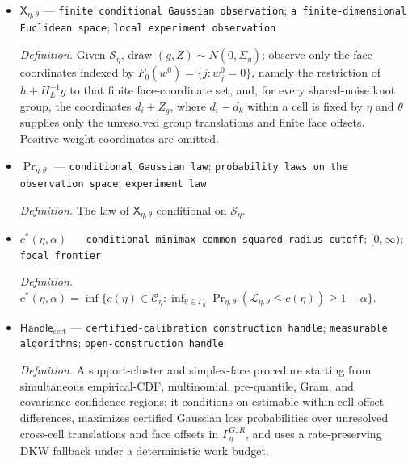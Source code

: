 \documentclass{article}
\begin{document}
\begin{itemize}
  \par\smallskip\noindent\emph{Definition.} Conditional covariance of the joint pre-score and post bridge coordinates given \(\mathscr S_\eta\), with pre block \(\Omega\), within-cell bridge covariance in the post block, and zero covariance between the independent pre and post blocks.
  \item \(\mathsf X_{\eta,\theta}\) --- \texttt{finite conditional Gaussian observation}; \texttt{a finite-\allowbreak{}dimensional Euclidean space}; \texttt{local experiment observation}
  \par\smallskip\noindent\emph{Definition.} Given \(\mathscr S_\eta\), draw \((g,Z)\sim N(0,\Sigma_\eta)\); observe only the face coordinates indexed by \(F_0(w^0)=\{j:w_j^0=0\}\), namely the restriction of \(h+H_L^{-1}g\) to that finite face-coordinate set, and, for every shared-noise knot group, the coordinates \(d_i+Z_g\), where \(d_i-d_k\) within a cell is fixed by \(\eta\) and \(\theta\) supplies only the unresolved group translations and finite face offsets. Positive-weight coordinates are omitted.
  \item \(\Pr_{\eta,\theta}\) --- \texttt{conditional Gaussian law}; \texttt{probability laws on the observation space}; \texttt{experiment law}
  \par\smallskip\noindent\emph{Definition.} The law of \(\mathsf X_{\eta,\theta}\) conditional on \(\mathscr S_\eta\).
  \item \(c^*(\eta,\alpha)\) --- \texttt{conditional minimax common squared-\allowbreak{}radius cutoff}; \([0,\infty)\); \texttt{focal frontier}
  \par\smallskip\noindent\emph{Definition.} \(c^*(\eta,\alpha)=\inf\{c(\eta)\in\mathscr C_\eta:\inf_{\theta\in\Gamma_\eta}\Pr_{\eta,\theta}(\mathcal L_{\eta,\theta}\leq c(\eta))\geq1-\alpha\}\).
  \item \(\mathsf{Handle}_{\mathrm{cert}}\) --- \texttt{certified-\allowbreak{}calibration construction handle}; \texttt{measurable algorithms}; \texttt{open-\allowbreak{}construction handle}
  \par\smallskip\noindent\emph{Definition.} A support-cluster and simplex-face procedure starting from simultaneous empirical-CDF, multinomial, pre-quantile, Gram, and covariance confidence regions; it conditions on estimable within-cell offset differences, maximizes certified Gaussian loss probabilities over unresolved cross-cell translations and face offsets in \(\Gamma_\eta^{G,R}\), and uses a rate-preserving DKW fallback under a deterministic work budget.

\end{itemize}
\end{document}
